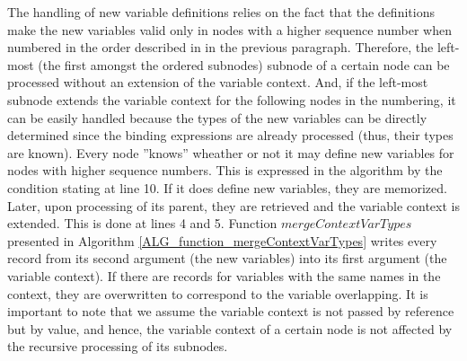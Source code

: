 The handling of new variable definitions relies on the fact that the definitions make the new variables valid only in nodes with a higher sequence number when numbered in the order described in in the previous paragraph. Therefore, the left-most (the first amongst the ordered subnodes) subnode of a certain node can be processed without an extension of the variable context. And, if the left-most subnode extends the variable context for the following nodes in the numbering, it can be easily handled because the types of the new variables can be directly determined since the binding expressions are already processed (thus, their types are known). Every node ''knows'' wheather or not it may define new variables for nodes with higher sequence numbers. This is expressed in the algorithm by the condition stating at line 10. If it does define new variables, they are memorized. Later, upon processing of its parent, they are retrieved and the variable context is extended. This is done at lines 4 and 5. Function $mergeContextVarTypes$ presented in Algorithm \ref{ALG_function_mergeContextVarTypes} writes every record from its second argument (the new variables) into its first argument (the variable context). If there are records for variables with the same names in the context, they are overwritten to correspond to the variable overlapping. It is important to note that we assume the variable context is not passed by reference but by value, and hence, the variable context of a certain node is not affected by the recursive processing of its subnodes.

